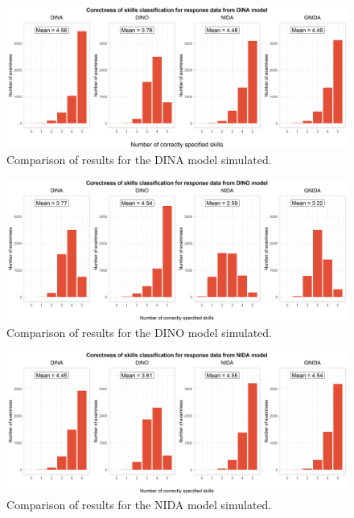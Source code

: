 \documentclass[english]{pwr_wmat_praca_dyplomowa}
\theoremstyle{plain}
\theoremstyle{definition}
\numberwithin{theorem}{chapter}
\begin{document}
\begin{figure}[h!]
	\centering
	\includegraphics[width=\textwidth]{DINA_skills_classification_col.png}
	\caption{Comparison of results for the DINA model simulated.}
	\label{comparison_dina}
\end{figure}

\begin{figure}[h!]
	\centering
	\includegraphics[width=\textwidth]{DINO_skills_classification_col.png}
	\caption{Comparison of results for the DINO model simulated.}
	\label{comparison_dino}
\end{figure}

\begin{figure}[h!]
	\centering
	\includegraphics[width=\textwidth]{NIDA_skills_classification_col.png}
	\caption{Comparison of results for the NIDA model simulated.}
	\label{comparison_nida}
\end{figure}
\end{document}
